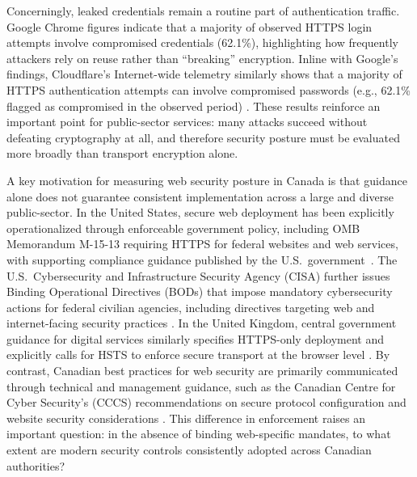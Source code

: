 \documentclass[pdflatex,sn-mathphys-num]{sn-jnl}
\numberwithin{equation}{section}
\theoremstyle{thmstyleone}
\theoremstyle{thmstyletwo}%
\theoremstyle{thmstylethree}%
\begin{document}
Concerningly, leaked credentials remain a routine part of authentication traffic. Google Chrome figures
indicate that a majority of observed HTTPS login attempts involve compromised credentials (62.1\%),
highlighting how frequently attackers rely on reuse rather than ``breaking'' encryption. Inline with
Google's findings, Cloudflare’s Internet-wide telemetry similarly shows that a majority of HTTPS authentication
attempts can involve compromised passwords (e.g., 62.1\% flagged as compromised in the observed period)
\cite{CloudflareRadarAppLayer}. These results reinforce an important point for public-sector services:
many attacks succeed without defeating cryptography at all, and therefore security posture must be evaluated
more broadly than transport encryption alone.

A key motivation for measuring web security posture in Canada is that guidance alone does not guarantee
consistent implementation across a large and diverse public-sector. In the United States, secure web deployment
has been explicitly operationalized through enforceable government policy, including OMB Memorandum M-15-13
requiring HTTPS for federal websites and web services, with supporting compliance guidance published by the
U.S.\ government~\cite{omb-m-15-13,uscio-https-guide}. The U.S.\ Cybersecurity and Infrastructure Security Agency
(CISA) further issues Binding Operational Directives (BODs) that impose mandatory cybersecurity actions for
federal civilian agencies, including directives targeting web and internet-facing security practices
\cite{cisa_bod_18_01}. In the United Kingdom, central government guidance for digital services similarly specifies
HTTPS-only deployment and explicitly calls for HSTS to enforce secure transport at the browser level
\cite{uk-using-https-service-manual}. By contrast, Canadian best practices for web security are primarily
communicated through technical and management guidance, such as the Canadian Centre for Cyber Security’s (CCCS)
recommendations on secure protocol configuration and website security considerations
\cite{cccs-itsp-40062,cccs-itsm-60005}. This difference in enforcement raises an important question:
in the absence of binding web-specific mandates, to what extent are modern security controls consistently
adopted across Canadian authorities?

\subsection{\color{red}{Literature}}
\end{document}
